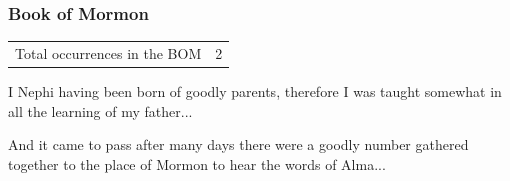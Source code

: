 		
	\subsubsection{Book of Mormon} %
		\label{GOODLY-BOM}
	
		\begin{tabular}{ll}
			Total occurrences in the BOM & 2
		\end{tabular}
		
		\begin{compactdesc}
			\item[1 Nephi 1:1] I Nephi having been born of goodly parents, therefore I was taught somewhat in all the learning of my father...
			\item[Mosiah 18:7] And it came to pass after many days there were a goodly number gathered together to the place of Mormon to hear the words of Alma...
		\end{compactdesc}
		
	
		
		
	
		
